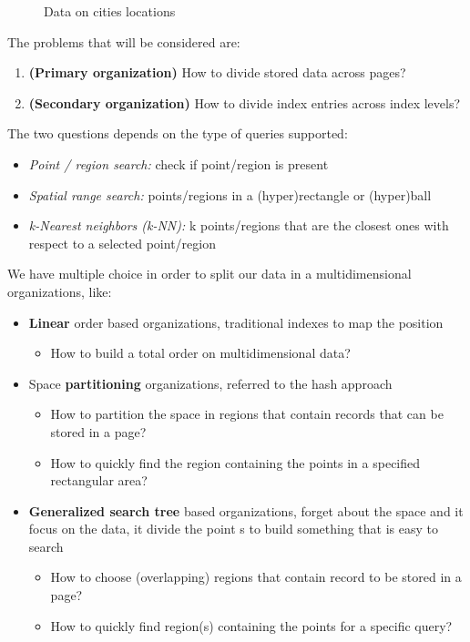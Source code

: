 \begin{figure}[!htb]
\begin{minipage}{0.48\textwidth}
     \caption{Data on cities locations}
   \end{minipage}
\end{figure}


The problems that will be considered are:
\begin{enumerate}
    \item \textbf{(Primary organization)} How to divide stored data across pages?
    \item \textbf{(Secondary organization)} How to divide index entries across index levels?
\end{enumerate}

The two questions depends on the type of queries supported:
\begin{itemize}
    \item \textit{Point / region search:} check if point/region is present
    \item \textit{Spatial range search:} points/regions in a (hyper)rectangle or (hyper)ball
    \item \textit{k-Nearest neighbors (k-NN):} k points/regions that are the closest ones with respect to a selected point/region
\end{itemize}
 
We have multiple choice in order to split our data in a multidimensional organizations, like:
\begin{itemize}
    \item \textbf{Linear} order based organizations, traditional indexes to map the position
    \begin{itemize}
        \item How to build a total order on multidimensional data?
    \end{itemize}
    \item Space \textbf{partitioning} organizations, referred to the hash approach 
    \begin{itemize}
        \item How to partition the space in regions that contain records that can be stored in a page?
        \item How to quickly find the region containing the points in a specified rectangular area?
    \end{itemize}
    \item \textbf{Generalized search tree} based organizations, forget about the space and it focus on the data, it divide the point s to build something that is easy to search
    \begin{itemize}
        \item How to choose (overlapping) regions that contain record to be stored in a page?
        \item How to quickly find region(s) containing the points for a specific query?
    \end{itemize}
\end{itemize}


